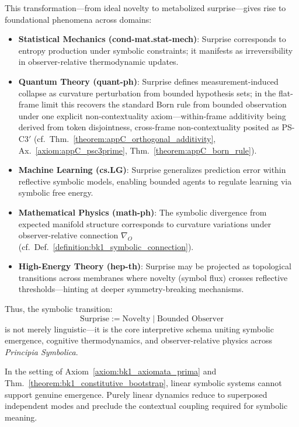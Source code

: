 \begin{tcolorbox}[colback=blue!5!white, colframe=blue!75!black, title=From Novelty to Surprise: The Operational Definition for Observer-Framed Divergence]
This transformation—from ideal novelty to metabolized surprise—gives rise to foundational phenomena across domains:
\begin{itemize}
    \item \textbf{Statistical Mechanics (cond-mat.stat-mech)}: Surprise corresponds to entropy production under symbolic constraints; it manifests as irreversibility in observer-relative thermodynamic updates.
    \item \textbf{Quantum Theory (quant-ph)}: Surprise defines measurement-induced collapse as curvature perturbation from bounded hypothesis sets; in the flat-frame limit this recovers the standard Born rule from bounded observation under one explicit non-contextuality axiom---within-frame additivity being derived from token disjointness, cross-frame non-contextuality posited as PS-C3$'$ (cf.~Thm.~\ref{theorem:appC_orthogonal_additivity}, Ax.~\ref{axiom:appC_psc3prime}, Thm.~\ref{theorem:appC_born_rule}).
    \item \textbf{Machine Learning (cs.LG)}: Surprise generalizes prediction error within reflective symbolic models, enabling bounded agents to regulate learning via symbolic free energy.
    \item \textbf{Mathematical Physics (math-ph)}: The symbolic divergence from expected manifold structure corresponds to curvature variations under observer-relative connection $\nabla_O$ (cf.~Def.~\ref{definition:bk1_symbolic_connection}).
    \item \textbf{High-Energy Theory (hep-th)}: Surprise may be projected as topological transitions across membranes where novelty (symbol flux) crosses reflective thresholds—hinting at deeper symmetry-breaking mechanisms.
\end{itemize}

Thus, the symbolic transition:
\[
\boxed{\text{Surprise} := \text{Novelty} \mid \text{Bounded Observer}}
\]
is not merely linguistic—it is the core interpretive schema uniting symbolic emergence, cognitive thermodynamics, and observer-relative physics across \textit{Principia Symbolica}.
\end{tcolorbox}



\begin{corollary}
\label{corollary:bk1_linear_insufficiency}
In the setting of Axiom~\ref{axiom:bk1_axiomata_prima} and Thm.~\ref{theorem:bk1_constitutive_bootstrap}, linear symbolic systems cannot support genuine emergence. Purely linear dynamics reduce to superposed independent modes and preclude the contextual coupling required for symbolic meaning.
\end{corollary}

